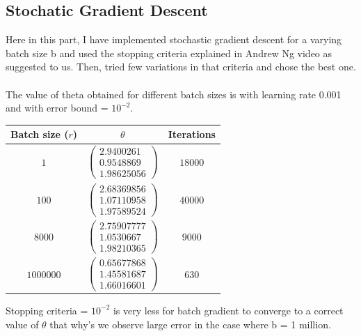 \documentclass[12pt]{article}
\begin{document}
\subsection{Stochatic Gradient Descent} Here in this part, I have implemented stochastic gradient descent for a varying batch size b and used the stopping criteria explained in Andrew Ng video as suggested to us. Then, tried few variations in that criteria and chose the best one.\\\\
The value of theta obtained for different batch sizes is with learning rate 0.001 and with error bound = $10^{-2}$.
\begin{center}
    \begin{tabular}{|c| c| c|}
        \hline
        \textbf{Batch size ($r$)} & \textbf{$\theta$} & \textbf{Iterations} \\
        \hline
        $1$ &
        $\begin{pmatrix}
            2.9400261\\
            0.9548869\\
            1.98625056
        \end{pmatrix}$
        & $18000$ \\
        \hline
        $100$ &
        $\begin{pmatrix}
            2.68369856\\
            1.07110958\\
            1.97589524
        \end{pmatrix}$
        & $40000$\\
        \hline
        $8000$ &
        $\begin{pmatrix}
            2.75907777\\
            1.0530667\\
            1.98210365
        \end{pmatrix}$
        & $9000$\\
        \hline
        $1000000$ &
        $\begin{pmatrix}
            0.65677868\\
            1.45581687\\
            1.66016601
        \end{pmatrix}$
        & $630$\\
        \hline
    \end{tabular}
\end{center}
Stopping criteria = $10^{-2}$ is very less for batch gradient to converge to a correct value of $\theta$ that why's we observe large error in the case where b = 1 million.
\end{document}
